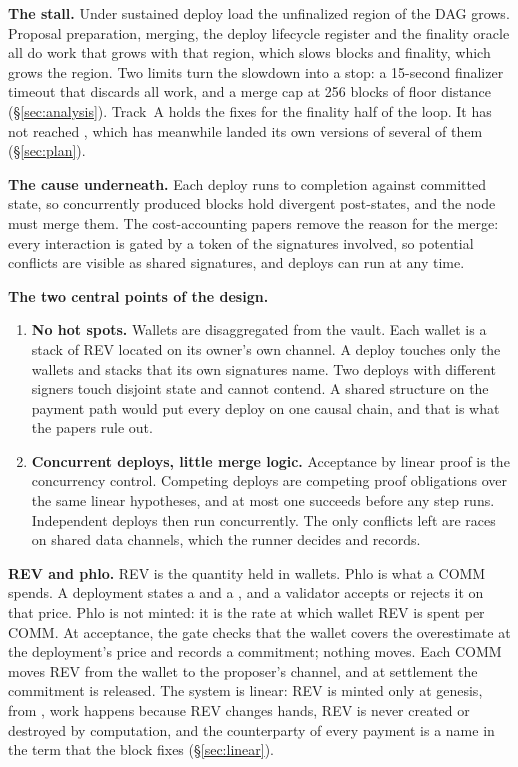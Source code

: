 \documentclass[11pt]{article}
\newcommand{\code}{\path}
\begin{document}
\textbf{The stall.} Under sustained deploy load the unfinalized region of the DAG grows. Proposal preparation, merging, the deploy lifecycle register and the finality oracle all do work that grows with that region, which slows blocks and finality, which grows the region. Two limits turn the slowdown into a stop: a 15-second finalizer timeout that discards all work, and a merge cap at 256 blocks of floor distance (\S\ref{sec:analysis}). Track~A holds the fixes for the finality half of the loop. It has not reached \code{dev}, which has meanwhile landed its own versions of several of them (\S\ref{sec:plan}).

\textbf{The cause underneath.} Each deploy runs to completion against committed state, so concurrently produced blocks hold divergent post-states, and the node must merge them. The cost-accounting papers remove the reason for the merge: every interaction is gated by a token of the signatures involved, so potential conflicts are visible as shared signatures, and deploys can run at any time.

\textbf{The two central points of the design.}
\begin{enumerate}
\item \textbf{No hot spots.} Wallets are disaggregated from the vault. Each wallet is a stack of REV located on its owner's own channel. A deploy touches only the wallets and stacks that its own signatures name. Two deploys with different signers touch disjoint state and cannot contend. A shared structure on the payment path would put every deploy on one causal chain, and that is what the papers rule out.
\item \textbf{Concurrent deploys, little merge logic.} Acceptance by linear proof is the concurrency control. Competing deploys are competing proof obligations over the same linear hypotheses, and at most one succeeds before any step runs. Independent deploys then run concurrently. The only conflicts left are races on shared data channels, which the runner decides and records.
\end{enumerate}

\textbf{REV and phlo.} REV is the quantity held in wallets. Phlo is what a COMM spends. A deployment states a \code{phloLimit} and a \code{phloPrice}, and a validator accepts or rejects it on that price. Phlo is not minted: it is the rate at which wallet REV is spent per COMM. At acceptance, the gate checks that the wallet covers the overestimate at the deployment's price and records a commitment; nothing moves. Each COMM moves \code{phloPrice} REV from the wallet to the proposer's channel, and at settlement the commitment is released. The system is linear: REV is minted only at genesis, from \code{wallets.txt}, work happens because REV changes hands, REV is never created or destroyed by computation, and the counterparty of every payment is a name in the term that the block fixes (\S\ref{sec:linear}).
\end{document}
